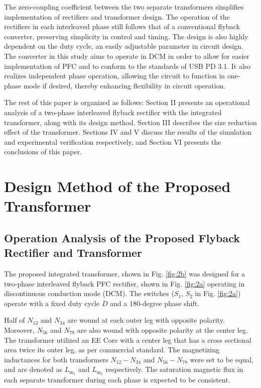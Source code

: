 \documentclass[lettersize,journal]{IEEEtran}
\begin{document}
The zero-coupling coefficient between the two separate transformers simplifies implementation of rectifiers and transformer design. The operation of the rectifiers in each interleaved phase still follows that of a conventional flyback converter, preserving simplicity in control and timing. The design is also highly dependent on the duty cycle, an easily adjustable parameter in circuit design. The converter in this study aims to operate in DCM in order to allow for easier implementation of PFC and to conform to the standards of USB PD 3.1. It also realizes independent phase operation, allowing the circuit to function in one-phase mode if desired, thereby enhancing flexibility in circuit operation.

The rest of this paper is organized as follows: Section II presents an operational analysis of a two-phase interleaved flyback rectifier with the integrated transformer, along with its design method. Section III describes the size reduction effect of the transformer. Sections IV and V discuss the results of the simulation and experimental verification respectively, and Section VI presents the conclusions of this paper.

\section{Design Method of the Proposed Transformer}

\subsection{Operation Analysis of the Proposed Flyback Rectifier and Transformer}
The proposed integrated transformer, shown in Fig. \ref{fig:2b} was designed for a two-phase interleaved flyback PFC rectifier, shown in Fig. \ref{fig:2a} operating in discontinuous conduction mode (DCM). The switches ($S_1$, $S_2$ in Fig. \ref{fig:2a}) operate with a fixed duty cycle $D$ and a 180-degree phase shift.

Half of $N_{12}$ and $N_{34}$ are wound at each outer leg with opposite polarity. Moreover, $N_{56}$ and $N_{78}$ are also wound with opposite polarity at the center leg. The transformer utilized an EE Core with a center leg that has a cross sectional area twice its outer leg, as per commercial standard. The magnetizing inductances for both transformers $N_{12}-N_{34}$ and $N_{56}-N_{78}$ were set to be equal, and are denoted as $L_{\mathrm{m}_1}$ and $L_{\mathrm{m}_2}$ respectively. The saturation magnetic flux in each separate transformer during each phase is expected to be consistent.
\end{document}
